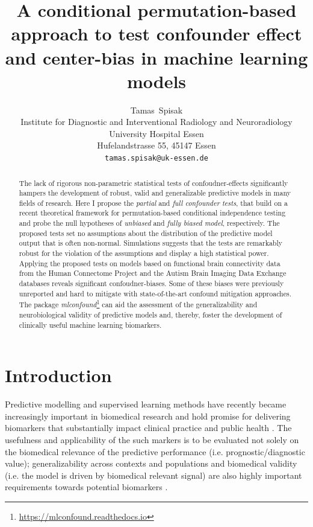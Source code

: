 \documentclass{article}
\title{A conditional permutation-based approach to test confounder effect and center-bias in machine learning models}
\author{
  Tamas~Spisak \\
  Institute for Diagnostic and Interventional Radiology and Neuroradiology \\
  University Hospital Essen\\
  Hufelandstrasse 55, 45147 Essen \\
  \texttt{tamas.spisak@uk-essen.de} \\
}
\begin{document}
\maketitle

\begin{abstract} %
The lack of rigorous non-parametric statistical tests of confoudner-effects significantly hampers the development of robust, valid and generalizable predictive models in many fields of research.
Here I propose the \emph{partial} and \emph{full confounder tests}, that build on a recent theoretical framework for permutation-based conditional independence testing and probe the null hypotheses of \emph{unbiased} and \emph{fully biased model}, respectively.
The proposed tests set no assumptions about the distribution of the predictive model output that is often non-normal.
Simulations suggests that the tests are remarkably robust for the violation of the assumptions and display a high statistical power.
Applying the proposed tests on models based on functional brain connectivity data from the Human Connectome Project and the Autism Brain Imaging Data Exchange databases reveals significant confoudner-biases. Some of these biases were previously unreported and hard to mitigate with state-of-the-art confound mitigation approaches.
The package \emph{mlconfound}\footnote{\href{https://mlconfound.readthedocs.io}{https://mlconfound.readthedocs.io}} can aid the assessment of the generalizability and neurobiological validity of predictive models and, thereby, foster the development of clinically useful machine learning biomarkers.
\end{abstract}



\section{Introduction}

Predictive modelling and supervised learning methods have recently became increasingly important in biomedical research and hold promise for delivering biomarkers that substantially impact clinical practice and public health \citep{kent2018personalized}. The usefulness and applicability of the such markers is to be evaluated not solely on the biomedical relevance of the predictive performance (i.e. prognostic/diagnostic value); generalizability across contexts and populations and biomedical validity (i.e. the model is driven by biomedical relevant signal) are also highly important requirements towards potential biomarkers \citep{woo2017building}.
\end{document}
